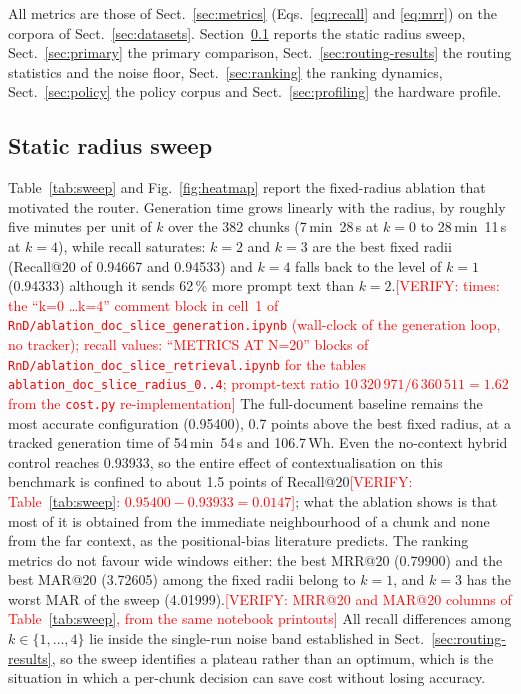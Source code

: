 \documentclass[pdflatex,sn-mathphys-num]{sn-jnl}
\makeatletter
\newcommand{\todo}[1]{\textcolor{red}{#1}}
\newcommand{\verify}[1]{\todo{[VERIFY: #1]}}
\newcommand{\Rec}[1]{Recall@#1}
\newcommand{\MRR}[1]{MRR@#1}
\newcommand{\MAR}[1]{MAR@#1}
\theoremstyle{thmstyleone}%
\theoremstyle{thmstylethree}%
\makeatother
\begin{document}
All metrics are those of Sect.~\ref{sec:metrics} (Eqs.~\eqref{eq:recall} and \eqref{eq:mrr}) on the corpora of Sect.~\ref{sec:datasets}. Section~\ref{sec:static} reports the static radius sweep, Sect.~\ref{sec:primary} the primary comparison, Sect.~\ref{sec:routing-results} the routing statistics and the noise floor, Sect.~\ref{sec:ranking} the ranking dynamics, Sect.~\ref{sec:policy} the policy corpus and Sect.~\ref{sec:profiling} the hardware profile.

\subsection{Static radius sweep}\label{sec:static}

Table~\ref{tab:sweep} and Fig.~\ref{fig:heatmap} report the fixed-radius ablation that motivated the router. Generation time grows linearly with the radius, by roughly five minutes per unit of $k$ over the 382 chunks (7\,min~28\,s at $k=0$ to 28\,min~11\,s at $k=4$), while recall saturates: $k=2$ and $k=3$ are the best fixed radii (\Rec{20} of 0.94667 and 0.94533) and $k=4$ falls back to the level of $k=1$ (0.94333) although it sends 62\,\% more prompt text than $k=2$.\verify{times: the ``k=0 \ldots k=4'' comment block in cell~1 of \texttt{RnD/ablation\_doc\_slice\_generation.ipynb} (wall-clock of the generation loop, no tracker); recall values: ``METRICS AT N=20'' blocks of \texttt{RnD/ablation\_doc\_slice\_retrieval.ipynb} for the tables \texttt{ablation\_doc\_slice\_radius\_0..4}; prompt-text ratio $10\,320\,971/6\,360\,511=1.62$ from the \texttt{cost.py} re-implementation} The full-document baseline remains the most accurate configuration (0.95400), 0.7 points above the best fixed radius, at a tracked generation time of 54\,min~54\,s and 106.7\,Wh. Even the no-context hybrid control reaches 0.93933, so the entire effect of contextualisation on this benchmark is confined to about 1.5 points of \Rec{20}\verify{Table~\ref{tab:sweep}: $0.95400-0.93933=0.0147$}; what the ablation shows is that most of it is obtained from the immediate neighbourhood of a chunk and none from the far context, as the positional-bias literature predicts. The ranking metrics do not favour wide windows either: the best \MRR{20} (0.79900) and the best \MAR{20} (3.72605) among the fixed radii belong to $k=1$, and $k=3$ has the worst MAR of the sweep (4.01999).\verify{\MRR{20} and \MAR{20} columns of Table~\ref{tab:sweep}, from the same notebook printouts} All recall differences among $k\in\{1,\dots,4\}$ lie inside the single-run noise band established in Sect.~\ref{sec:routing-results}, so the sweep identifies a plateau rather than an optimum, which is the situation in which a per-chunk decision can save cost without losing accuracy.
\end{document}
